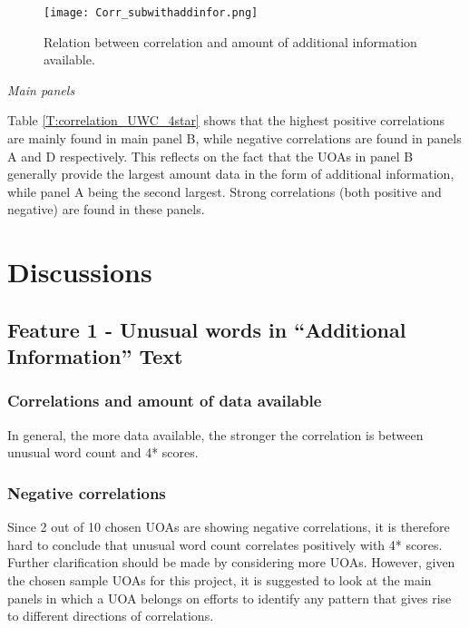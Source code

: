 \documentclass[a4paper, 11pt]{article}
\begin{document}
\begin{figure}[H]
\begin{center}  \centering
  \texttt{[image: Corr\_subwithaddinfor.png]}
  \caption{Relation between correlation and amount of additional information available.}
  \label{fig:corr_perc}
\end{center}
\end{figure}


\noindent
\emph{Main panels}

\noindent
Table \ref{T:correlation_UWC_4star} shows that the highest positive correlations are mainly found in main panel B, while negative correlations are found in panels A and D respectively. This reflects on the fact that the UOAs in panel B generally provide the largest amount data in the form of additional information, while panel A being the second largest. Strong correlations (both positive and negative) are found in these panels. 




\section{Discussions}
\subsection{Feature 1 - Unusual words in ``Additional Information'' Text}

\subsubsection{Correlations and amount of data available}

In general, the more data available, the stronger the correlation is between unusual word count and 4* scores.

\subsubsection{Negative correlations}

Since 2 out of 10 chosen UOAs are showing negative correlations, it is therefore hard to conclude that unusual word count correlates positively with 4* scores. Further clarification should be made by considering more UOAs. However, given the chosen sample UOAs for this project, it is suggested to look at the main panels in which a UOA belongs on efforts to identify any pattern that gives rise to different directions of correlations.
\end{document}
